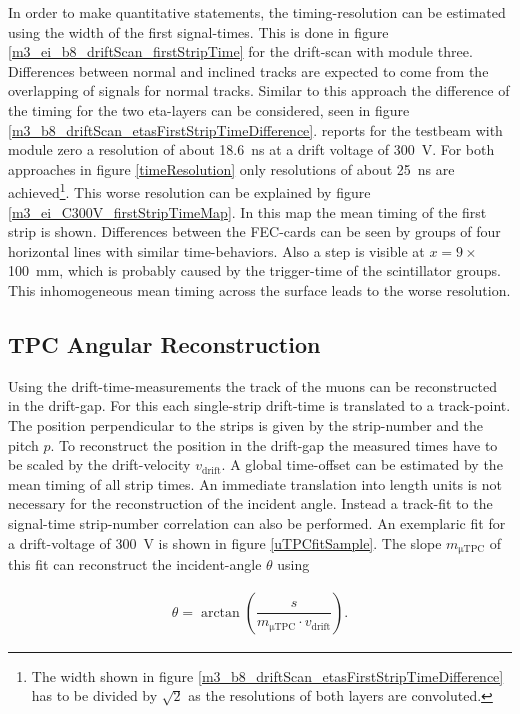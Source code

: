 \documentclass[
twoside,            %
BCOR1.4cm,          %
10pt,               %
headings=normal,    %
headsepline,        %
clearplainpage,		%
final,              %
div=14,
open=right,
bibliography=toc
]{scrreprt}
\begin{document}
In order to make quantitative statements, the timing-resolution can be estimated using the width of the first signal-times.
This is done in figure \ref{m3_ei_b8_driftScan_firstStripTime} for the drift-scan with module three.
Differences between normal and inclined tracks are expected to come from the overlapping of signals for normal tracks.
Similar to this approach the difference of the timing for the two eta-layers can be considered, seen in figure \ref{m3_b8_driftScan_etasFirstStripTimeDifference}.
\cite{flierlThesis} reports for the testbeam with module zero a resolution of about \SI{18.6}{ns} at a drift voltage of \SI{300}{V}.
For both approaches in figure \ref{timeResolution} only resolutions of about \SI{25}{ns} are achieved\footnote{
	The width shown in figure \ref{m3_b8_driftScan_etasFirstStripTimeDifference} has to be divided by $\sqrt{2}$ as the resolutions of both layers are convoluted.
}.
This worse resolution can be explained by figure \ref{m3_ei_C300V_firstStripTimeMap}.
In this map the mean timing of the first strip is shown.
Differences between the FEC-cards can be seen by groups of four horizontal lines with similar time-behaviors.
Also a step is visible at $x = 9\times$\SI{100}{mm}, which is probably caused by the trigger-time of the scintillator groups.
This inhomogeneous mean timing across the surface leads to the worse resolution.

\subsection{\textmu TPC Angular Reconstruction}

Using the drift-time-measurements the track of the muons can be reconstructed in the drift-gap.
For this each single-strip drift-time is translated to a track-point.
The position perpendicular to the strips is given by the strip-number and the pitch $p$.
To reconstruct the position in the drift-gap the measured times have to be scaled by the drift-velocity $v_{\mathrm{drift}}$.
A global time-offset can be estimated by the mean timing of all strip times.
An immediate translation into length units is not necessary for the reconstruction of the incident angle.
Instead a track-fit to the signal-time strip-number correlation can also be performed.
An exemplaric fit for a drift-voltage of \SI{300}{V} is shown in figure \ref{uTPCfitSample}.
The slope $m_{\si{\micro}\mathrm{TPC}}$ of this fit can reconstruct the incident-angle $\theta$ using

\begin{align}
	\theta = \arctan\left( \dfrac{s}{m_{\si{\micro}\mathrm{TPC}} \cdot v_{\mathrm{drift}}} \right).
	\label{uTPCangle}
\end{align}
\end{document}
